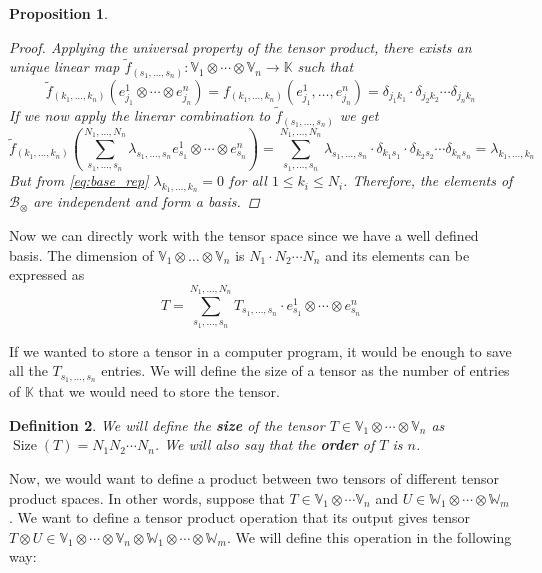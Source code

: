 \documentclass[11pt,a4paper,openright,oneside]{book}
\numberwithin{equation}{section}
\newtheorem{defn0}{Definition}[chapter]
\newtheorem{prop0}[defn0]{Proposition}
\newenvironment{definition}{ \begin{defn0}}{\end{defn0}}
\newenvironment{proposition}{\bigskip \begin{prop0}}{\end{prop0}}
\DeclareMathOperator{\size}{Size}
\begin{document}
\begin{proposition}
\begin{proof}
Applying the universal property of the tensor product, there exists an unique linear map $\tilde f_{(s_1, \dots, s_n)} : \mathbb{V}_1 \otimes \cdots \otimes \mathbb{V}_n \rightarrow \mathbb{K}$
such that
$$\tilde f_{(k_1, \dots, k_n)}(e_{j_1}^1 \otimes \cdots \otimes e_{j_n}^n) = f_{(k_1, \dots, k_n)}(e_{j_1}^1, \dots, e_{j_n}^n) = \delta_{j_1 k_1} \cdot \delta_{j_2 k_2} \cdots \delta_{j_n k_n}$$
If we now apply the linerar combination to $\tilde f_{(s_1, \dots, s_n)}$ we get
$$\tilde f_{(k_1, \dots, k_n)} \left( 
\sum_{s_1, \dots, s_n}^{N_1, \dots, N_n} \lambda_{s_1, \dots, s_n} e_{s_1}^1 \otimes \cdots \otimes e_{s_n}^n 
\right) =  \sum_{s_1, \dots, s_n}^{N_1, \dots, N_n} \lambda_{s_1, \dots, s_n} \cdot \delta_{k_1 s_1} \cdot \delta_{k_2 s_2} \cdots \delta_{k_n s_n} = \lambda_{k_1, \dots, k_n}$$
But from \eqref{eq:base_rep} $\lambda_{k_1, \dots, k_n} = 0$ for all
$1 \leqslant k_i \leqslant N_i$. Therefore, the elements of $\mathcal{B}_\otimes$ are independent and form a basis.
\end{proof}
\end{proposition}


Now we can directly work with the tensor space since 
 we have a well defined basis. The dimension
    of ${\mathbb{V}_1 \otimes \dots \otimes \mathbb{V}_n}$ is ${N_1 \cdot N_2 \cdots N_n}$ and its elements can be expressed as
    \begin{equation} \label{eq:base-representation}
T = \sum_{s_1, \dots, s_n}^{N_1, \dots, N_n} T_{s_1, \dots, s_n} \cdot  e_{s_1}^1 \otimes \cdots \otimes e_{s_n}^n
\end{equation}

If we wanted to store a tensor in a computer program, it would be enough to save all the $T_{s_1, \dots, s_n}$ entries. We will define 
the size of a tensor as the number of entries of $\mathbb{K}$ that we would need to store the tensor.

\begin{definition}
We will define the \textbf{size} of the tensor $T \in \mathbb{V}_1 \otimes \cdots \otimes \mathbb{V}_n$ as $\size(T) = N_1 N_2 \cdots N_n$. We will 
also say that the \textbf{order} of $T$ is $n$.
\end{definition}

Now, we would want to define a product between two tensors of different tensor product spaces. 
In other words, suppose that
$T \in \mathbb{V}_1 \otimes \cdots \mathbb{V}_n$ and $U \in \mathbb{W}_1 \otimes \cdots \otimes \mathbb{W}_m$. We want 
to define a tensor product
operation that its output gives tensor $T \otimes U \in \mathbb{V}_1 \otimes \cdots \otimes \mathbb{V}_n \otimes \mathbb{W}_1 \otimes \cdots \otimes \mathbb{W}_m$.
We will define this operation in the following way:
\end{document}
